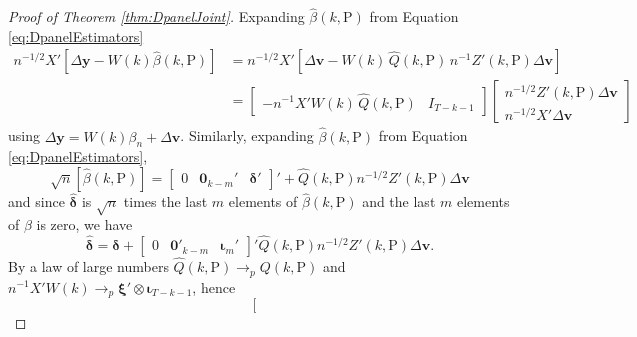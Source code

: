 \begin{proof}[Proof of Theorem \ref{thm:DpanelJoint}]
  Expanding $\widehat{\beta}(k,\text{P})$ from Equation \ref{eq:DpanelEstimators} 
  \begin{align*}
    n^{-1/2}X'\left[ \Delta \mathbf{y} - W(k)\widehat{\beta}(k,\text{P})  \right] 
    &= n^{-1/2}X'\left[ \Delta \mathbf{v}  - W(k)\, \widehat{Q}(k,\text{P}) \, n^{-1} Z'(k,\text{P})\Delta \mathbf{v}\right] \\
    &= \left[
    \begin{array}{cc}
      -n^{-1} X'W(k) \, \widehat{Q}(k,\text{P}) & I_{T-k-1}
    \end{array}
  \right] 
  \left[
  \begin{array}{c}
    n^{-1/2}Z'(k,\text{P}) \Delta \mathbf{v} \\
    n^{-1/2} X' \Delta \mathbf{v}
  \end{array}
\right]
  \end{align*}
  using $\Delta \mathbf{y} = W(k) \beta_n + \Delta \mathbf{v}$. 
  Similarly, expanding $\widehat{\beta}(k,\text{P})$ from Equation \ref{eq:DpanelEstimators},
  \[
    \sqrt{n}\left[ \widehat{\beta}(k,\text{P}) \right] = \left[
    \begin{array}{ccc}
      0 & \mathbf{0}_{k-m}' & \boldsymbol{\delta}'  
    \end{array}
  \right]' + \widehat{Q}(k,\text{P}) n^{-1/2}Z'(k,\text{P}) \Delta \mathbf{v}
  \]
  and since $\widehat{\boldsymbol{\delta}}$ is $\sqrt{n}$ times the last $m$ elements of $\widehat{\beta}(k,\text{P})$ and the last $m$ elements of $\beta$ is zero, we have
  \[
    \widehat{\boldsymbol{\delta}} = \boldsymbol{\delta} + \left[
    \begin{array}{ccc}
    0 & \mathbf{0}'_{k-m} & \boldsymbol{\iota}_m'  
    \end{array}
  \right]' \widehat{Q}(k,\text{P}) n^{-1/2} Z'(k,\text{P})\Delta \mathbf{v}.
  \]
  By a law of large numbers $\widehat{Q}(k,\text{P}) \rightarrow_p Q(k,\text{P})$ and $n^{-1}X'W(k) \rightarrow_p \boldsymbol{\xi}' \otimes \boldsymbol{\iota}_{T-k-1}$, hence 
  \[
    \left[
    \begin{array}{c}

\end{array}\]
\end{proof}
